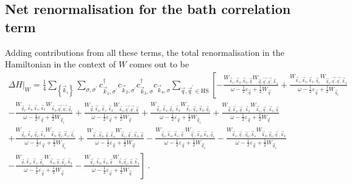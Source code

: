 \documentclass{revtex4-2}
\begin{document}
\subsection{Net renormalisation for the bath correlation term}
Adding contributions from all these terms, the total renormalisation in the Hamiltonian in the context of \(W\) comes out to be
\begin{equation}\begin{aligned}
	\Delta H\bigg|_{W} = \frac{1}{4}\sum_{\left\{ \vec k_i \right\}}\sum_{\sigma,\sigma^\prime} c^\dagger_{\vec k_1,\sigma^\prime}c_{\vec k_2,\sigma^\prime}c^\dagger_{\vec k_3,\sigma} c_{\vec k_4,\sigma} \sum_{\vec q, \vec q^\prime \in \text{HS}}\left[-\frac{W_{\vec k_1,\vec k_2,\vec k_3,\vec q} W_{\vec q,\vec{q^\prime},\vec{q^\prime},\vec k_4}}{\omega - \frac{1}{2}\varepsilon_{\vec q} + \frac{1}{2}W_{\vec q}} + \frac{W_{\vec k_1,\vec k_2,\vec k_3,\vec q_t} W_{\vec q_t,\vec{q^\prime},\vec{q^\prime},\vec k_4}}{\omega - \frac{1}{2}\varepsilon_{\vec q} + \frac{1}{2}W_{\vec q_t}} \right.\\
\left.- \frac{W_{\vec q_t,\vec k_4,\vec k_1,\vec k_2} W_{\vec k_3,\vec{q^\prime},\vec{q^\prime},\vec q_t}}{\omega - \frac{1}{2}\varepsilon_{\vec q} + \frac{1}{2}W_{\vec q_t}}
 + \frac{W_{\vec q,\vec k_4,\vec k_1,\vec k_2} W_{\vec k_3,\vec{q^\prime},\vec{q^\prime},\vec q}}{\omega - \frac{1}{2}\varepsilon_{\vec q} + \frac{1}{2}W_{\vec q}}
 + \frac{W_{\vec q_t,\vec k_4, \vec q_t^\prime, \vec k_2} W_{\vec k_1,\vec q_t^\prime, \vec k_3, \vec q_t}}{\omega - \frac{1}{2}\varepsilon_{\vec q} + \frac{1}{2}W_{\vec q_t}} + \frac{W_{\vec q,\vec k_4, \vec q^\prime, \vec k_2} W_{\vec k_1,\vec q^\prime, \vec k_3, \vec q}}{\omega - \frac{1}{2}\varepsilon_{\vec q} + \frac{1}{2}W_{\vec q}}\right.\\
\left.+ \frac{W_{\vec q_t,\vec k_4, \vec q_t^\prime, \vec k_2} W_{\vec k_3, \vec q_t, \vec k_1,\vec q_t^\prime}}{\omega - \frac{1}{2}\varepsilon_{\vec q} + \frac{1}{2}W_{\vec q_t}} 
+ \frac{W_{\vec q^\prime, \vec k_2, \vec q,\vec k_4} W_{\vec k_1,\vec q^\prime, \vec k_3, \vec q}}{\omega - \frac{1}{2}\varepsilon_{\vec q} + \frac{1}{2}W_{\vec q}} - \frac{W_{\vec q_t,\vec k_4, \vec k_1, \vec q^\prime} W_{\vec q^\prime, \vec k_2, \vec k_3, \vec q_t}}{\omega - \frac{1}{2}\varepsilon_{\vec q}  + \frac{1}{2}W_{\vec q_t}}
- \frac{W_{\vec k_1, \vec q^\prime, \vec q_t,\vec k_4} W_{\vec k_3, \vec q_t, \vec q^\prime, \vec k_2}}{\omega - \frac{1}{2}\varepsilon_{\vec q}  + \frac{1}{2}W_{\vec q_t}} \right.\\
\left.- \frac{W_{\vec q,\vec k_4, \vec k_1, \vec q_t^\prime} W_{\vec k_3, \vec q, \vec q_t^\prime, \vec k_2}}{\omega - \frac{1}{2}\varepsilon_{\vec q}  + \frac{1}{2}W_{\vec q}} - \frac{W_{\vec q_t^\prime, \vec k_2, \vec k_3, \vec q} W_{\vec k_1 \vec q_t^\prime, \vec q, \vec k_4}}{\omega - \frac{1}{2}\varepsilon_{\vec q}  + \frac{1}{2}W_{\vec q}} \right]~.
\end{aligned}\end{equation}
\end{document}
